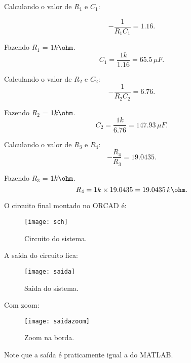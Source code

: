 Calculando o valor de $R_1$ e $C_1$:

\[
    -\frac{1}{R_1C_1} = 1.16.
\]

Fazendo $R_1$ = $1 k\ohm$.
\[
    C_1 = \frac{1k}{1.16} = 65.5 \, \mu F.
\]


Calculando o valor de $R_2$ e $C_2$:
\[
    -\frac{1}{R_2C_2} = 6.76.
\]

Fazendo $R_2$ = $1 k\ohm$.
\[
C_2 = \frac{1k}{6.76} = 147.93 \, \mu F.
\]

Calculando o valor de $R_3$ e $R_4$:
\[
-\frac{R_4}{R_3} = 19.0435.
\]

Fazendo $R_3$ = $1 k\ohm$.
\[
R_4 = 1k\times 19.0435 = 19.0435  \, k \ohm.
\]

O circuito final montado no ORCAD é:
\begin{figure}[H]
    \centering
    \caption{Circuito do sistema.}
    \texttt{[image: sch]}
    \label{f_sch}
\end{figure}

A saída do circuito fica:
\begin{figure}[H]
    \centering
    \caption{Saida do sistema.}
    \texttt{[image: saida]}
    \label{f_saida}
\end{figure}

Com zoom:
\begin{figure}[H]
    \centering
    \caption{Zoom na borda.}
    \texttt{[image: saidazoom]}
    \label{f_saidazoom}
\end{figure}


Note que a saída é praticamente igual a do MATLAB.
